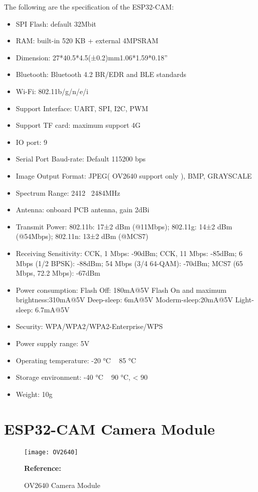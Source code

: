 The following are the specification of the ESP32-CAM:
\begin{itemize}
	\item SPI Flash: default 32Mbit
	\item RAM: built-in 520 KB + external 4MPSRAM
	\item Dimension: 27*40.5*4.5(±0.2)mm1.06*1.59*0.18”
	\item Bluetooth: Bluetooth 4.2 BR/EDR and BLE standards
	\item Wi-Fi: 802.11b/g/n/e/i
	\item Support Interface: UART, SPI, I2C, PWM
	\item Support TF card: maximum support 4G
	\item IO port: 9
	\item Serial Port Baud-rate: Default 115200 bps
	\item Image Output Format: JPEG( OV2640 support only ), BMP, GRAYSCALE
	\item Spectrum Range: 2412 ~2484MHz
	\item Antenna: onboard PCB antenna, gain 2dBi
	\item Transmit Power: 802.11b: 17±2 dBm (@11Mbps);
	                  802.11g: 14±2 dBm (@54Mbps);                              802.11n: 13±2 dBm (@MCS7)
	\item Receiving Sensitivity: CCK, 1 Mbps: -90dBm;
							 CCK, 11 Mbps: -85dBm; 
							 6 Mbps (1/2 BPSK): -88dBm;
							 54 Mbps (3/4 64-QAM): -70dBm;
						     MCS7 (65 Mbps, 72.2 Mbps): -67dBm
	\item Power consumption: Flash Off: 180mA@5V
						      Flash On and maximum brightness:310mA@5V             Deep-sleep: 6mA@5V                                    Moderm-sleep:20mA@5V                                  Light-sleep: 6.7mA@5V
	\item Security: WPA/WPA2/WPA2-Enterprise/WPS
	\item Power supply range: 5V
	\item Operating temperature: -20 °C ~ 85 °C
	\item Storage environment: -40 °C ~ 90 °C, < 90%
	\item Weight: 10g
\end{itemize}
\section{ESP32-CAM Camera Module}

\begin{figure}  [H]
	\begin{center}
		\texttt{[image: OV2640]}
		\caption{OV2640 Camera Module} 
		\label{fig:OV2640 Camera Module}
		\footnotesize \textbf{Reference:} \autocite{}
	\end{center}                                   
\end{figure}

